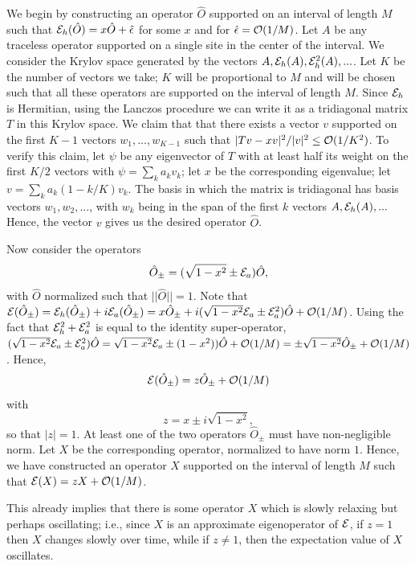 \documentclass[twocolumn,superscriptaddress, prl,showpacs]{revtex4-1}
\newcommand{\be}{\begin{equation}}
\newcommand{\ee}{\end{equation}}
\begin{document}
We begin by constructing an operator $\hat{O}$ supported on an interval of length $M$ such that ${\cal E}_h(\hat{O})= x \hat{O}+\hat{\epsilon}$ for some $x$ and for $\hat{\epsilon}={\cal O}(1/M)$.  Let $A$ be any traceless operator supported on a single site in the center of the interval.  We consider the Krylov space generated by the vectors $A, {\cal E}_h(A), {\cal E}_h^2(A),...$.  Let $K$ be the number of vectors we take; $K$ will be proportional to $M$ and will be chosen such that all these operators are supported on the interval of length $M$.
Since ${\cal E}_h$ is Hermitian, using the Lanczos procedure we can write it as a tridiagonal matrix $T$ in this Krylov space.   We claim that that there exists a vector $v$ supported on the first $K-1$ vectors $w_1,...,w_{K-1}$ such that $|Tv-xv|^2/|v|^2\leq {\cal O}(1/K^2)$.  To verify this claim, let $\psi$ be any eigenvector of $T$ with at least half its weight on the first $K/2$ vectors with $\psi=\sum_k a_k v_k$; let $x$ be the corresponding eigenvalue; let $v=\sum_k a_k (1-k/K) v_k$.
The basis in which the matrix is tridiagonal has basis vectors $w_1,w_2,...$, with $w_k$ being in the span of the first $k$ vectors $A, {\cal E}_h(A),...$
Hence, the vector $v$ gives us the desired operator $\hat{O}$.

Now consider the operators
\be
\hat{O}_{\pm}=(\sqrt{1-x^2} \pm {\cal E}_a) \hat{O},
\ee
with $\hat{O}$ normalized such that $||\hat{O}||=1$.
Note that ${\cal E}(\hat{O}_{\pm})={\cal E}_h(\hat{O}_{\pm})+i {\cal E}_a(\hat{O}_{\pm})=x\hat{O}_{\pm}+i(\sqrt{1-x^2}{\cal E}_a \pm {\cal E}_a^2) \hat{O} + {\cal O}(1/M)$.  Using
the fact that ${\cal E}_h^2+{\cal E}_a^2$ is equal to the identity super-operator, $(\sqrt{1-x^2}{\cal E}_a \pm {\cal E}_a^2) \hat{O}=\sqrt{1-x^2}{\cal E}_a \pm (1-x^2) ) \hat{O} +{\cal O}(1/M)=\pm\sqrt{1-x^2}\hat{O}_{\pm}+{\cal O}(1/M)$.
Hence,
\be
{\cal E}(\hat{O}_{\pm})=z \hat{O}_{\pm}+{\cal O}(1/M)
\ee
with
\be
z=x\pm i \sqrt{1-x^2},
\ee
so that $|z|=1$.
At least one of the two operators $\hat{O}_{\pm}$ must have non-negligible norm.  Let $X$ be the corresponding operator, normalized to have norm $1$.  Hence, we have constructed an operator $X$ supported on the interval of length $M$ such that ${\cal E}(X)=z X + {\cal O}(1/M)$.

This already implies that there is some operator $X$ which is slowly relaxing but perhaps oscillating; i.e., since $X$ is an approximate eigenoperator of ${\cal E}$, if $z=1$ then $X$ changes slowly over time, while if $z \neq 1$, then the expectation value of $X$ oscillates.
\end{document}
